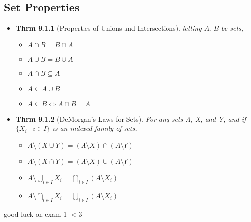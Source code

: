 \documentclass[11pt]{article}
\theoremstyle{definition}
\begin{document}
\subsection*{Set Properties}
\begin{itemize}
    \item \textbf{Thrm 9.1.1} (Properties of Unions and Intersections). \emph{letting $A$, $B$ be sets,}
    \begin{itemize}
        \item $A\cap B = B\cap A$
        \item $A\cup B = B\cup A$
        \item $A\cap B \subseteq A$
        \item $A \subseteq A \cup B$
        \item $A\subseteq B \Leftrightarrow A\cap B = A$
    \end{itemize}
    \item \textbf{Thrm 9.1.2} (DeMorgan's Laws for Sets). \emph{For any sets A, X, and Y, and if \\$\{X_i \mid i \in I\}$ is an indexed family of sets,}
    \begin{itemize}
        \item $A\setminus (X\cup Y) = (A\setminus X)\cap(A\setminus Y)$
        \item $A\setminus (X\cap Y) = (A\setminus X)\cup(A\setminus Y)$
        \item $\displaystyle A\setminus\bigcup_{i\in I}X_i = \bigcap_{i\in I}(A\setminus X_i)$
        \item $\displaystyle A\setminus\bigcap_{i\in I}X_i = \bigcup_{i\in I}(A\setminus X_i)$
    \end{itemize}
\end{itemize}
good luck on exam 1 $<$3
\end{document}
